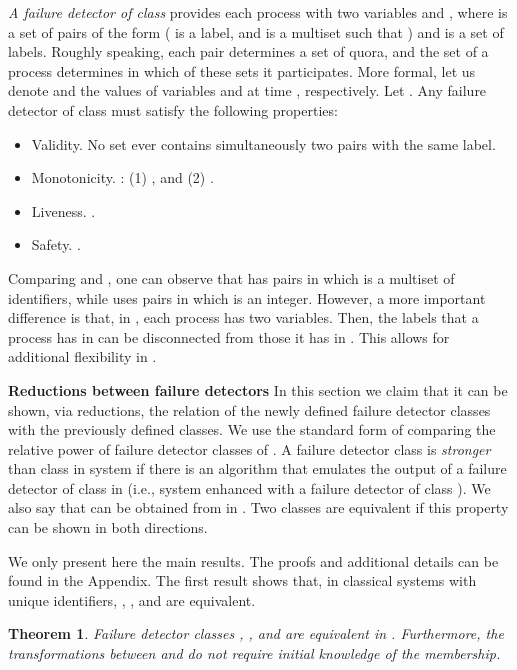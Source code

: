 \documentclass[10pt, conference, compsocconf]{IEEEtran}
\newtheorem{theorem}{Theorem}
\newcommand{\tightparagraph}[1]{\smallskip \noindent \textbf{#1} \hspace{1ex}}
\begin{document}
\emph{A failure detector of class } 
provides each process  
with two variables  and , where  is a set 
of pairs of the form  ( is a label, and  is a multiset such 
that ) and  is a set of labels. 
Roughly speaking, each pair  determines a set of quora, and the set 
 of a process  determines in which of these sets it 
participates. More formal,
let us denote  and   the values of 
variables  and  at time , respectively.
Let .
Any failure detector of class  must satisfy the following properties: 
\begin{itemize}
\item
Validity.  No set  ever contains simultaneously two pairs 
with the same label.
\item
Monotonicity.
: 
(1) , and 
(2) .
\item
Liveness. .
\item
Safety. .
\end{itemize}
Comparing  and , one can observe that  has pairs  
in which  is a multiset of identifiers, while  uses pairs  
in which  is an integer. However,
a more important difference is that, in , each process has two variables.
 Then, the labels that a process  has in  can be disconnected 
from those it has in
. This allows for additional flexibility in .


\tightparagraph{Reductions between failure detectors}
\label{red-FD}
In this section we claim that it can be shown, via reductions, 
the relation of the newly defined failure detector classes with 
the previously defined classes.
We use the standard form of comparing the relative power of failure 
detector classes of \cite{DBLP:journals/jacm/ChandraT96}.
A failure detector class  is \emph{stronger} than class  in 
system  if there is an algorithm  that emulates the 
output of a failure detector of class  in  
(i.e., system  enhanced with a failure detector  
of class ). We also say that  can be obtained from  
in . Two classes are equivalent if this property 
can be shown in both directions.

We only present here the main results. 
The proofs and additional details can be found in the Appendix.
The first result shows that, 
in classical systems with unique identifiers, , , 
and  are equivalent.

\begin{theorem}
\label{thm:equivalent}
Failure detector classes , , and  are equivalent 
in . Furthermore,
the transformations between  and  do not require 
initial knowledge of the membership.
\end{theorem}
\end{document}
